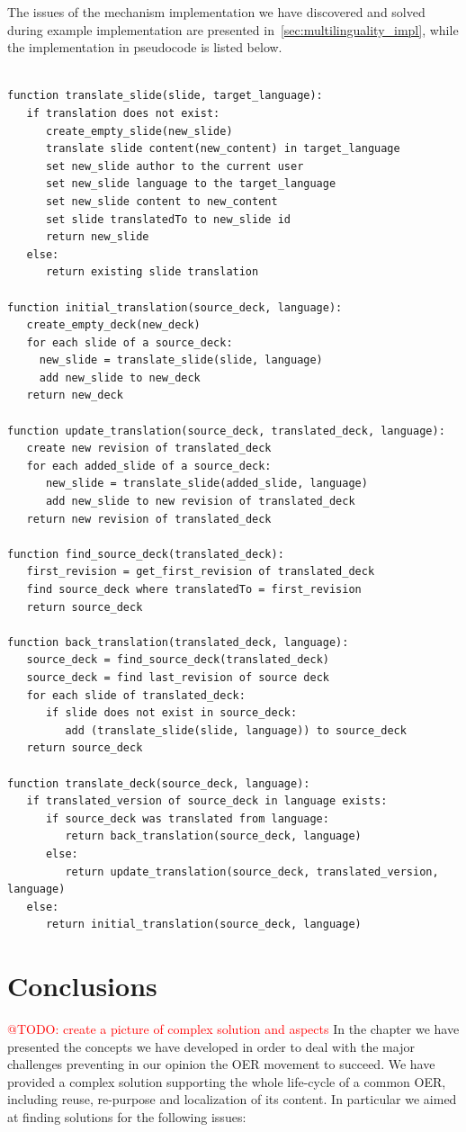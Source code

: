 \documentclass[ngerman,UKenglish,table]{scrbook}
\makeatletter
\newcommand{\todo}[1]{\textcolor{red}{@TODO: #1}}
\makeatother
\begin{document}
The issues of the mechanism implementation we have discovered and solved during example implementation are presented in~\autoref{sec:multilinguality_impl}, while the implementation in pseudocode is listed below.


\begin{lstlisting}

function translate_slide(slide, target_language):
   if translation does not exist:
      create_empty_slide(new_slide)
      translate slide content(new_content) in target_language  
      set new_slide author to the current user
      set new_slide language to the target_language
      set new_slide content to new_content
      set slide translatedTo to new_slide id
      return new_slide
   else: 
      return existing slide translation
   
function initial_translation(source_deck, language):
   create_empty_deck(new_deck)
   for each slide of a source_deck:
     new_slide = translate_slide(slide, language)
     add new_slide to new_deck
   return new_deck
   
function update_translation(source_deck, translated_deck, language):
   create new revision of translated_deck
   for each added_slide of a source_deck:     
      new_slide = translate_slide(added_slide, language)
      add new_slide to new revision of translated_deck
   return new revision of translated_deck
   
function find_source_deck(translated_deck):
   first_revision = get_first_revision of translated_deck 
   find source_deck where translatedTo = first_revision
   return source_deck
   
function back_translation(translated_deck, language):
   source_deck = find_source_deck(translated_deck)
   source_deck = find last_revision of source deck
   for each slide of translated_deck:
      if slide does not exist in source_deck:
         add (translate_slide(slide, language)) to source_deck
   return source_deck
   
function translate_deck(source_deck, language):
   if translated_version of source_deck in language exists:
      if source_deck was translated from language:
         return back_translation(source_deck, language)
      else:
         return update_translation(source_deck, translated_version, language)
   else:
      return initial_translation(source_deck, language)
\end{lstlisting}


\section{Conclusions}
\todo{create a picture of complex solution and aspects}
In the chapter we have presented the concepts we have developed in order to deal with the major challenges preventing in our opinion the OER movement to succeed.
We have provided a complex solution supporting the whole life-cycle of a common OER, including reuse, re-purpose and localization of its content.
In particular we aimed at finding solutions for the following issues:
\end{document}
